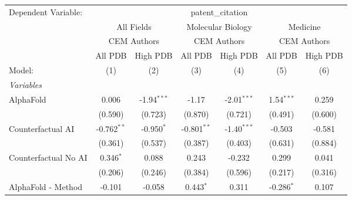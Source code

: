 \begingroup
\centering
\begin{tabular}{lcccccc}
   \tabularnewline \midrule \midrule
   Dependent Variable: & \multicolumn{6}{c}{patent\_citation}\\
 & \multicolumn{2}{c}{All Fields} & \multicolumn{2}{c}{Molecular Biology} & \multicolumn{2}{c}{Medicine} \\
\cmidrule(lr){2-3} \cmidrule(lr){4-5} \cmidrule(lr){6-7}
 & \multicolumn{2}{c}{CEM Authors} & \multicolumn{2}{c}{CEM Authors} & \multicolumn{2}{c}{CEM Authors} \\
\cmidrule(lr){2-3} \cmidrule(lr){4-5} \cmidrule(lr){6-7}
 & \multicolumn{1}{c}{All PDB} & \multicolumn{1}{c}{High PDB} & \multicolumn{1}{c}{All PDB} & \multicolumn{1}{c}{High PDB} & \multicolumn{1}{c}{All PDB} & \multicolumn{1}{c}{High PDB} \\
\cmidrule(lr){2-2} \cmidrule(lr){3-3} \cmidrule(lr){4-4} \cmidrule(lr){5-5} \cmidrule(lr){6-6} \cmidrule(lr){7-7}
   Model:                                                     & (1)           & (2)           & (3)           & (4)           & (5)           & (6)\\  
   \midrule
   \emph{Variables}\\
   AlphaFold                                                  & 0.006         & -1.94$^{***}$ & -1.17         & -2.01$^{***}$ & 1.54$^{***}$  & 0.259\\   
                                                              & (0.590)       & (0.723)       & (0.870)       & (0.721)       & (0.491)       & (0.600)\\   
   Counterfactual AI                                          & -0.762$^{**}$ & -0.950$^{*}$  & -0.801$^{**}$ & -1.40$^{***}$ & -0.503        & -0.581\\   
                                                              & (0.361)       & (0.537)       & (0.387)       & (0.403)       & (0.631)       & (0.884)\\   
   Counterfactual No AI                                       & 0.346$^{*}$   & 0.088         & 0.243         & -0.232        & 0.299         & 0.041\\   
                                                              & (0.206)       & (0.246)       & (0.384)       & (0.596)       & (0.217)       & (0.316)\\   
   AlphaFold - Method                                         & -0.101        & -0.058        & 0.443$^{*}$   & 0.311         & -0.286$^{*}$  & 0.107\\   

\end{tabular}
